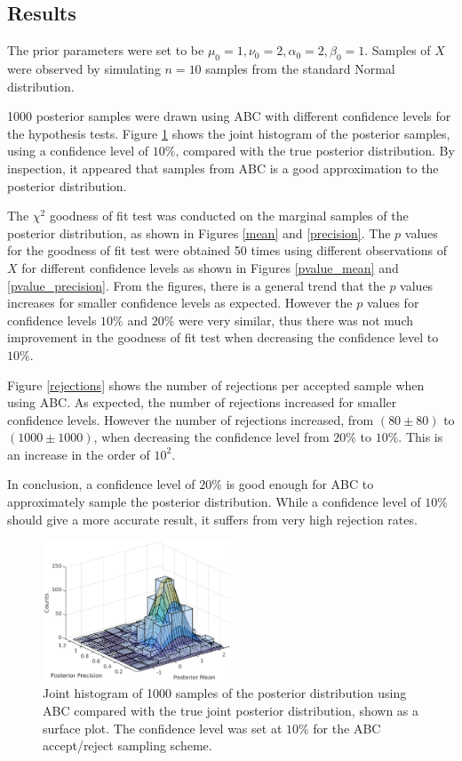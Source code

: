\documentclass[a4paper,10pt]{article}
\begin{document}
\subsection{Results}
The prior parameters were set to be $\mu_0=1,\nu_0=2,\alpha_0=2,\beta_0=1$. Samples of $X$ were observed by simulating $n=10$ samples from the standard Normal distribution.

1000 posterior samples were drawn using ABC with different confidence levels for the hypothesis tests. Figure \ref{surf} shows the joint histogram of the posterior samples, using a confidence level of $10\%$, compared with the true posterior distribution. By inspection, it appeared that samples from ABC is a good approximation to the posterior distribution.

The $\chi^2$ goodness of fit test was conducted on the marginal samples of the posterior distribution, as shown in Figures \ref{mean} and \ref{precision}. The $p$ values for the goodness of fit test were obtained 50 times using different observations of $X$ for different confidence levels as shown in Figures \ref{pvalue_mean} and \ref{pvalue_precision}. From the figures, there is a general trend that the $p$ values increases for smaller confidence levels as expected. However the $p$ values for confidence levels $10\%$ and $20\%$ were very similar, thus there was not much improvement in the goodness of fit test when decreasing the confidence level to $10\%.$

Figure \ref{rejections} shows the number of rejections per accepted sample when using ABC. As expected, the number of rejections increased for smaller confidence levels. However the number of rejections increased, from $(80\pm80)$ to $(1000\pm1000)$, when decreasing the confidence level from $20\%$ to $10\%$. This is an increase in the order of $10^2$.

In conclusion, a confidence level of $20\%$ is good enough for ABC to approximately sample the posterior distribution. While a confidence level of $10\%$ should give a more accurate result, it suffers from very high rejection rates.

\begin{figure}
\includegraphics[width=0.5\textwidth]{surf.eps}
\caption{Joint histogram of 1000 samples of the posterior distribution using ABC compared with the true joint posterior distribution, shown as a surface plot. The confidence level was set at $10\%$ for the ABC accept/reject sampling scheme.}
\label{surf}
\end{figure}
\end{document}
